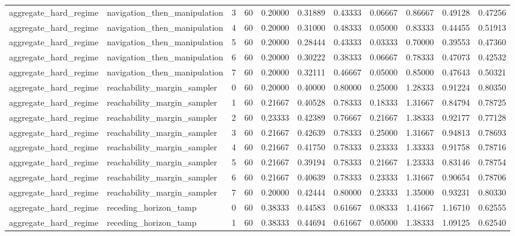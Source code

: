 \documentclass{article}
\begin{document}
\begin{table}[tbp]
{\begin{tabular}{lllllllllll}
aggregate\_hard\_regime & navigation\_then\_manipulation & 3 & 60 & 0.20000 & 0.31889 & 0.43333 & 0.06667 & 0.86667 & 0.49128 & 0.47256 \\
aggregate\_hard\_regime & navigation\_then\_manipulation & 4 & 60 & 0.20000 & 0.31000 & 0.48333 & 0.05000 & 0.83333 & 0.44455 & 0.51913 \\
aggregate\_hard\_regime & navigation\_then\_manipulation & 5 & 60 & 0.20000 & 0.28444 & 0.43333 & 0.03333 & 0.70000 & 0.39553 & 0.47360 \\
aggregate\_hard\_regime & navigation\_then\_manipulation & 6 & 60 & 0.20000 & 0.30222 & 0.38333 & 0.06667 & 0.78333 & 0.47073 & 0.42532 \\
aggregate\_hard\_regime & navigation\_then\_manipulation & 7 & 60 & 0.20000 & 0.32111 & 0.46667 & 0.05000 & 0.85000 & 0.47643 & 0.50321 \\
aggregate\_hard\_regime & reachability\_margin\_sampler & 0 & 60 & 0.20000 & 0.40000 & 0.80000 & 0.25000 & 1.28333 & 0.91224 & 0.80350 \\
aggregate\_hard\_regime & reachability\_margin\_sampler & 1 & 60 & 0.21667 & 0.40528 & 0.78333 & 0.18333 & 1.31667 & 0.84794 & 0.78725 \\
aggregate\_hard\_regime & reachability\_margin\_sampler & 2 & 60 & 0.23333 & 0.42389 & 0.76667 & 0.21667 & 1.38333 & 0.92177 & 0.77128 \\
aggregate\_hard\_regime & reachability\_margin\_sampler & 3 & 60 & 0.21667 & 0.42639 & 0.78333 & 0.25000 & 1.31667 & 0.94813 & 0.78693 \\
aggregate\_hard\_regime & reachability\_margin\_sampler & 4 & 60 & 0.21667 & 0.41750 & 0.78333 & 0.23333 & 1.33333 & 0.91758 & 0.78716 \\
aggregate\_hard\_regime & reachability\_margin\_sampler & 5 & 60 & 0.21667 & 0.39194 & 0.78333 & 0.21667 & 1.23333 & 0.83146 & 0.78754 \\
aggregate\_hard\_regime & reachability\_margin\_sampler & 6 & 60 & 0.21667 & 0.40639 & 0.78333 & 0.23333 & 1.31667 & 0.90654 & 0.78706 \\
aggregate\_hard\_regime & reachability\_margin\_sampler & 7 & 60 & 0.20000 & 0.42444 & 0.80000 & 0.23333 & 1.35000 & 0.93231 & 0.80330 \\
aggregate\_hard\_regime & receding\_horizon\_tamp & 0 & 60 & 0.38333 & 0.44583 & 0.61667 & 0.08333 & 1.41667 & 1.16710 & 0.62555 \\
aggregate\_hard\_regime & receding\_horizon\_tamp & 1 & 60 & 0.38333 & 0.44694 & 0.61667 & 0.05000 & 1.38333 & 1.09125 & 0.62540 \\

\end{tabular}}
\end{table}
\end{document}
